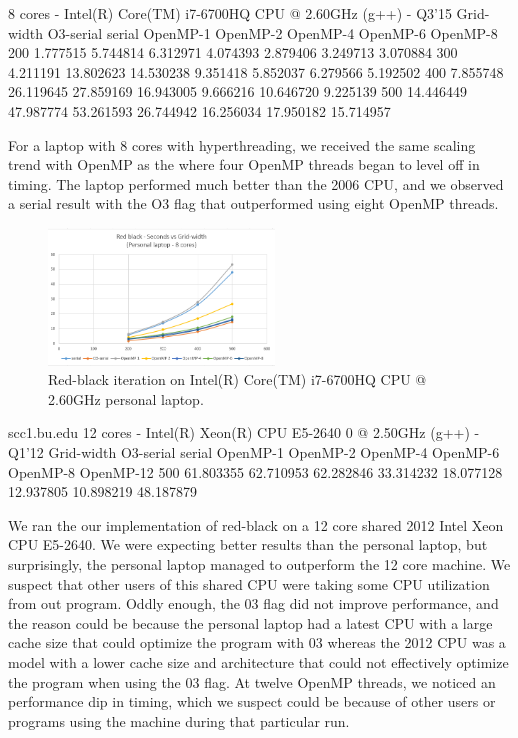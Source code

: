 \documentclass[paper=a4, fontsize=11pt]{scrartcl} %
\numberwithin{equation}{section} %
\numberwithin{figure}{section} %
\numberwithin{table}{section} %
\begin{document}
8 cores - Intel(R) Core(TM) i7-6700HQ CPU @ 2.60GHz (g++) - Q3'15
Grid-width O3-serial serial OpenMP-1 OpenMP-2 OpenMP-4 OpenMP-6 OpenMP-8
200	1.777515 5.744814 6.312971 4.074393 2.879406 3.249713 3.070884
300 4.211191 13.802623 14.530238 9.351418 5.852037 6.279566 5.192502
400 7.855748 26.119645 27.859169 16.943005 9.666216 10.646720 9.225139 
500 14.446449 47.987774 53.261593 26.744942 16.256034 17.950182 15.714957

For a laptop with 8 cores with hyperthreading, we received the same scaling trend with OpenMP as the where four OpenMP threads began to level off in timing. The laptop performed much better than the 2006 CPU, and we observed a serial result with the O3 flag that outperformed using eight OpenMP threads. 

\begin{figure}
\includegraphics[width=60mm]{red-black-laptop-graph.png}
\caption{Red-black iteration on Intel(R) Core(TM) i7-6700HQ CPU @ 2.60GHz personal laptop.}
\label{fig:redblack-laptop}
\end{figure}

scc1.bu.edu
12 cores - Intel(R) Xeon(R) CPU E5-2640 0 @ 2.50GHz (g++) - Q1'12
Grid-width O3-serial serial OpenMP-1 OpenMP-2 OpenMP-4 OpenMP-6 OpenMP-8 OpenMP-12
500 61.803355 62.710953 62.282846 33.314232 18.077128 12.937805 10.898219 48.187879

We ran the our implementation of red-black on a 12 core shared 2012 Intel Xeon CPU E5-2640. We were expecting better results than the personal laptop, but surprisingly, the personal laptop managed to outperform the 12 core machine. We suspect that other users of this shared CPU were taking some CPU utilization from out program. Oddly enough, the 03 flag did not improve performance, and the reason could be because the personal laptop had a latest CPU with a large cache size that could optimize the program with 03 whereas the 2012 CPU was a model with a lower cache size and architecture that could not effectively optimize the program when using the 03 flag. At twelve OpenMP threads, we noticed an performance dip in timing, which we suspect could be because of other users or programs using the machine during that particular run.
\end{document}
